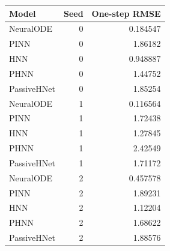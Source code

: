 \begin{tabular}{lrr}
\toprule
Model & Seed & One-step RMSE \\ \midrule
NeuralODE & 0 & 0.184547 \\
PINN & 0 & 1.86182 \\
HNN & 0 & 0.948887 \\
PHNN & 0 & 1.44752 \\
PassiveHNet & 0 & 1.85254 \\
NeuralODE & 1 & 0.116564 \\
PINN & 1 & 1.72438 \\
HNN & 1 & 1.27845 \\
PHNN & 1 & 2.42549 \\
PassiveHNet & 1 & 1.71172 \\
NeuralODE & 2 & 0.457578 \\
PINN & 2 & 1.89231 \\
HNN & 2 & 1.12204 \\
PHNN & 2 & 1.68622 \\
PassiveHNet & 2 & 1.88576 \\
\bottomrule
\end{tabular}